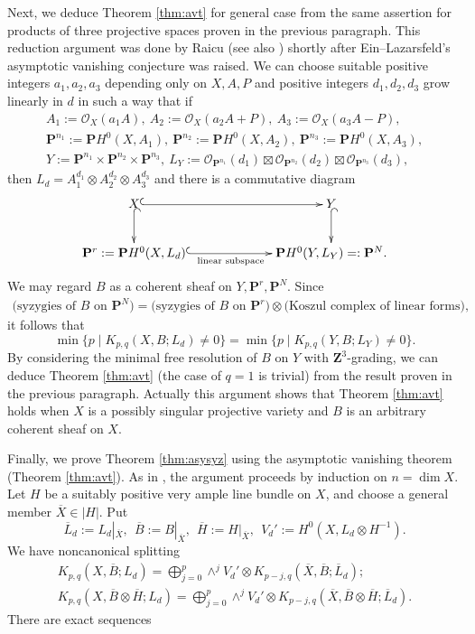\documentclass[graybox]{svmult}
\newcommand{\Z}{\mathbf{Z}}
\newcommand{\sO}{\mathscr{O}}
\def\nP{\mathbf{P}}
\begin{document}
Next, we deduce Theorem \ref{thm:avt} for general case from the same assertion for products of three projective spaces proven in the previous paragraph. This reduction argument was done by Raicu  \cite[Appendix]{Raicu} (see also \cite[Subsection 3.3]{Park1}) shortly after Ein--Lazarsfeld's asymptotic vanishing conjecture \cite[Conjecture 7.1]{EL2} was raised.
We can choose suitable positive integers $a_1, a_2, a_3$ depending only on $X,A,P$ and positive integers $d_1, d_2, d_3$ grow linearly in $d$ in such a way that  if 
$$
\begin{array}{l}
A_1:=\sO_X(a_1A), ~A_2:=\sO_X(a_2A + P), ~A_3:=\sO_X(a_3A-P),\\
\nP^{n_1}:=\nP H^0(X, A_1),~\nP^{n_2}:=\nP H^0(X, A_2),~\nP^{n_3}:=\nP H^0(X, A_3),\\
Y:=\nP^{n_1} \times \nP^{n_2} \times \nP^{n_3}, ~L_Y:=\sO_{\nP^{n_1}}(d_1) \boxtimes \sO_{\nP^{n_2}}(d_2) \boxtimes \sO_{\nP^{n_3}}(d_3),
\end{array}
$$
then $L_d=A_1^{d_1} \otimes A_2^{d_2} \otimes A_3^{d_3}$ and there is a commutative diagram
$$
\xymatrixcolsep{0.9in}
\xymatrix{
X \ar@{^{(}->}[r] \ar@{^{(}->}[d] & Y \ar@{^{(}->}[d]\\
\nP^r:=\nP H^0(X, L_d) \ar@{^{(}->}[r]_-{\text{linear subspace}} & \nP H^0(Y, L_Y)=:\nP^N.
}
$$
We may regard $B$ as a coherent sheaf on $Y, \nP^r,\nP^N$. 
Since
$$
\begin{array}{l}
\text{(syzygies of $B$ on $\nP^N$)} = \text{(syzygies of $B$ on $\nP^r$)} \otimes \text{(Koszul complex of linear forms)},
\end{array}
$$
it follows that
$$
\min\{ p \mid K_{p,q}(X, B; L_d) \neq 0 \} = \min\{ p \mid K_{p,q}(Y, B; L_Y) \neq 0\}.
$$
By considering the minimal free resolution of $B$ on $Y$ with $\Z^3$-grading, we can deduce Theorem \ref{thm:avt} (the case of $q=1$ is trivial) from the result proven in the previous paragraph. Actually this argument shows that Theorem \ref{thm:avt} holds when $X$ is a possibly singular projective variety and $B$ is an arbitrary coherent sheaf on $X$.

Finally, we prove Theorem \ref{thm:asysyz} using the asymptotic vanishing theorem (Theorem \ref{thm:avt}). As in \cite{EL2}, the argument proceeds by induction on $n=\dim X$. Let $H$ be a suitably positive very ample line bundle on $X$, and choose a general member $\overline{X} \in |H|$. Put
$$
\overline{L}_d:=L_d|_{\overline{X}},~~\overline{B}:=B|_{\overline{X}},~~\overline{H}:=H|_{\overline{X}}, ~~V_d':=H^0(X, L_d \otimes H^{-1}).
$$
We have noncanonical splitting
$$
\begin{array}{l}
K_{p,q}(X, \overline{B}; L_d) = \bigoplus_{j=0}^p \wedge^j V_d' \otimes K_{p-j, q}(\overline{X}, \overline{B}; \overline{L}_d);\\
K_{p,q}(X, \overline{B} \otimes \overline{H}; L_d) =   \bigoplus_{j=0}^p \wedge^j V_d' \otimes K_{p-j, q}(\overline{X}, \overline{B} \otimes \overline{H}; \overline{L}_d).
\end{array}
$$
There are exact sequences\\[-22pt]
\end{document}
